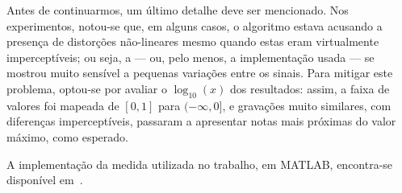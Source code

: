 Antes de continuarmos, um último detalhe deve ser mencionado. Nos experimentos,
notou-se que, em alguns casos, o algoritmo estava acusando a presença de distorções
não-lineares mesmo quando estas eram virtualmente imperceptíveis; ou seja, a \rnonlin{}
--- ou, pelo menos, a implementação usada --- se mostrou muito sensível a pequenas
variações entre os sinais. Para mitigar este problema, optou-se por avaliar o
$\log_{10}(x)$ dos resultados: assim, a faixa de valores foi mapeada de $[0, 1]$ para
$(-\infty, 0]$, e gravações muito similares, com diferenças imperceptíveis, passaram a
apresentar notas mais próximas do valor máximo, como esperado.

A implementação da medida utilizada no trabalho, em MATLAB, encontra-se disponível
em~\cite{rnonlin-calc}.

